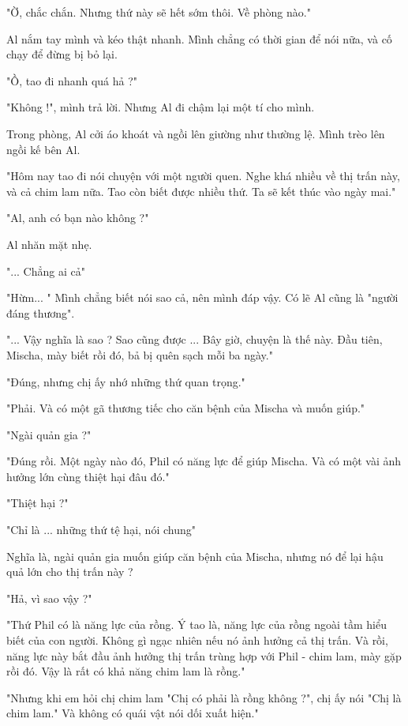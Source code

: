  "Ờ, chắc chắn. Nhưng thứ này sẽ hết sớm thôi. Về phòng nào."
 
 Al nắm tay mình và kéo thật nhanh. Mình chẳng có thời gian để nói nữa, và cố chạy để đừng bị bỏ lại.
 
 "Ồ, tao đi nhanh quá hả ?"
 
 "Không !", mình trả lời. Nhưng Al đi chậm lại một tí cho mình.
 
 
 Trong phòng, Al cởi áo khoát và ngồi lên giường như thường lệ. Mình trèo lên ngồi kế bên Al.
 
 "Hôm nay tao đi nói chuyện với một người quen. Nghe khá nhiều về thị trấn này, và cả chim lam nữa. Tao còn biết được nhiều thứ. Ta sẽ kết thúc vào ngày mai."
 
 "Al, anh có bạn nào không ?"
 
 Al nhăn mặt nhẹ.
 
 "... Chẳng ai cả"
 
 "Hừm... " Mình chẳng biết nói sao cả, nên mình đáp vậy. Có lẽ Al cũng là "người đáng thương".
 
 "... Vậy nghĩa là sao ? Sao cũng được ... Bây giờ, chuyện là thế này. Đầu tiên, Mischa, mày biết rồi đó, bả bị quên sạch mỗi ba ngày."
 
 "Đúng, nhưng chị ấy nhớ những thứ quan trọng."
 
 "Phải. Và có một gã thương tiếc cho căn bệnh của Mischa và muốn giúp."
 
 "Ngài quản gia ?"
 
 "Đúng rồi. Một ngày nào đó, Phil có năng lực để giúp Mischa. Và có một vài ảnh hưởng lớn cùng thiệt hại đâu đó."
 
 "Thiệt hại ?"
 
 "Chỉ là ... những thứ tệ hại, nói chung"
 
 Nghĩa là, ngài quản gia muốn giúp căn bệnh của Mischa, nhưng nó để lại hậu quả lớn cho thị trấn này ?
 
 "Hả, vì sao vậy ?"
 
 "Thứ Phil có là năng lực của rồng. Ý tao là, năng lực của rồng ngoài tầm hiểu biết của con người. Không gì ngạc nhiên nếu nó ảnh hưởng cả thị trấn. Và rồi, năng lực này bắt đầu ảnh hưởng thị trấn trùng hợp với Phil - chim lam, mày gặp rồi đó. Vậy là rất có khả năng chim lam là rồng."
 
 "Nhưng khi em hỏi chị chim lam "Chị có phải là rồng không ?", chị ấy nói "Chị là chim lam." Và không có quái vật nói dối xuất hiện."
 

